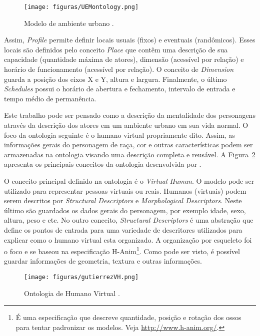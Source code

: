 \begin{figure}[t]
  \centering
    \texttt{[image: figuras/UEMontology.png]}
  \caption{Modelo de ambiente urbano \cite{paiva2005ontology}.}
  \label{fig:UEM}
\end{figure}

Assim, \emph{Profile} permite definir locais usuais (fixos) e eventuais
(randômicos). Esses locais são definidos pelo conceito \emph{Place} que contêm
uma descrição de sua capacidade (quantidade máxima de atores), dimensão
(acessível por relação) e horário de funcionamento (acessível por relação). O
conceito de \emph{Dimension} guarda a posição dos eixos X e Y, altura e
largura. Finalmente, o último \emph{Schedules} possui o horário de abertura e
fechamento, intervalo de entrada e tempo médio de permanência. %

Este trabalho pode ser pensado como a descrição da mentalidade dos personagens
através da descrição dos atores em um ambiente urbano em sua vida normal. O
foco da ontologia seguinte é o humano virtual propriamente dito. Assim, as
informações gerais do personagem de raça, cor e outras características  podem
ser armazenadas na ontologia visando uma descrição completa e reusável.
A Figura~\ref{fig:OVH} apresenta os principais conceitos da ontologia
desenvolvida por \citet{Gutierrez:2007:OVH:1229160.1229164}.

O conceito principal definido na ontologia é o \emph{Virtual Human}. O modelo
pode ser utilizado para representar pessoas virtuais ou reais. Humanos
(virtuais) podem serem descritos por \emph{Structural Descriptors} e
\emph{Morphological Descriptors}. Neste último são guardados os dados gerais
do personagem, por exemplo idade, sexo, altura, peso e etc. No outro conceito,
\emph{Structural Descriptors} é uma abstração que define os pontos de entrada
para uma variedade de descritores utilizados para explicar como o humano
virtual esta organizado. A organização por esqueleto foi o foco e se baseou na
especificação H-Anim\footnote{É uma especificação que descreve quantidade,
posição e rotação dos ossos para tentar padronizar os modelos.
Veja \url{http://www.h-anim.org/}.}. Como pode ser visto, é possível guardar
informações de geometria, textura e outras informações.

\begin{figure}[t]
  \centering
    \texttt{[image: figuras/gutierrezVH.png]}
  \caption{Ontologia de Humano Virtual \cite{Gutierrez:2007:OVH:1229160.1229164}.}
  \label{fig:OVH}
\end{figure}

